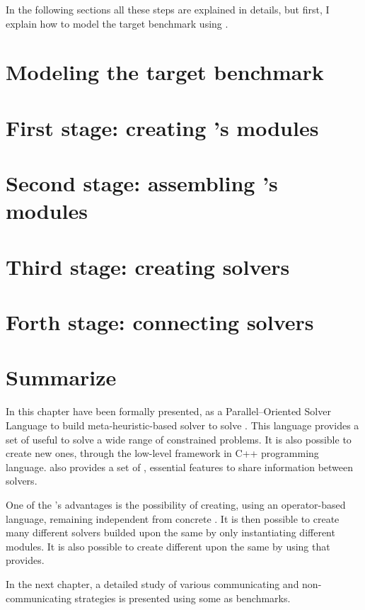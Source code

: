 In the following sections all these steps are explained in details, but first, I explain how to model the target benchmark using \posl.

\section{Modeling the target benchmark}\label{sec:model}


\section{First stage: creating \posl's modules}\label{sec:1ststage}


\section{Second stage: assembling \posl's modules}\label{sec:2ndstage}


\section{Third stage: creating \posl{} solvers}\label{sec:3rdstage}


\section{Forth stage: connecting solvers}\label{sec:4thstage}


\section{Summarize}
\label{sec:posl_zum}

In this chapter \posl{} have been formally presented, as a Parallel--Oriented Solver Language to build meta-heuristic-based solver to solve \CSPs{}. This language provides a set of \oms{} useful to solve a wide range of constrained problems. It is also possible to create new ones, through the low-level framework in C++ programming language. \posl{} also provides a set of \opchs{}, essential features to share information between solvers.

One of the \posl's advantages is the possibility of creating, using an operator-based language, \ass{} remaining independent from concrete \bothmodules{}. It is then possible to create many different solvers builded upon the same \as{} by only instantiating different modules. It is also possible to create different \comstrs{} upon the same \soset{} by using \commopers{} that \posl{} provides.

In the next chapter, a detailed study of various communicating and non-communicating strategies is presented using some \CSPs{} as benchmarks. %
